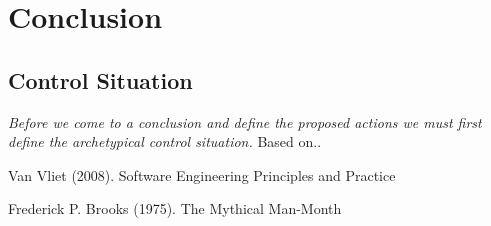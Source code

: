 \documentclass[12pt]{article} %
\begin{document}
	\section{Conclusion} %
	
	\subsection {Control Situation}
	
	\textit{Before we come to a conclusion and define the proposed actions we must first define the archetypical control situation. } Based on.. \\ %
	
	
	\newpage
	
	
	\begin{thebibliography}{99} %
		
		Van Vliet (2008).
		\newblock Software Engineering Principles and Practice
		
		Frederick P. Brooks (1975).
		\newblock The Mythical Man-Month
		
	\end{thebibliography}
	
	
\end{document}
